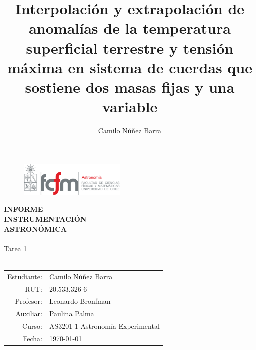 \documentclass[letter, 11pt, twocolumn]{article}
\title{Interpolación y extrapolación de anomalías de la temperatura superficial terrestre y tensión máxima en sistema de cuerdas que sostiene dos masas fijas y una variable}
\author{Camilo Núñez Barra}
\begin{document}
\begin{figure}[H]
	\includegraphics[width=2in]{fcfm_das}
\end{figure}
\begin{center}
	\textbf{\huge{INFORME\\INSTRUMENTACIÓN\\ASTRONÓMICA}}\\\,\\Tarea 1\\\,
\end{center}
\begin{tabular}{rl}
	Estudiante:&Camilo Núñez Barra\\
	RUT:&20.533.326-6\\
	Profesor:&Leonardo Bronfman\\
	Auxiliar:&Paulina Palma\\
	Curso:&AS3201-1 Astronomía Experimental\\
	Fecha:&\today
\end{tabular}







\end{document}
